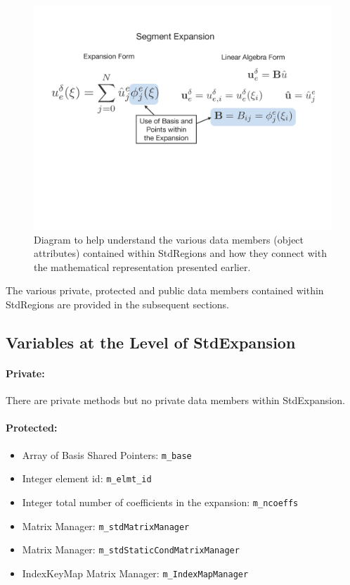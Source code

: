 \begin{figure}[htb]
\centering
\includegraphics[width=6in]{img/StdExpansion.png}
\caption{Diagram to help understand the various data members (object attributes) contained within StdRegions and how they connect with the mathematical representation presented earlier.}
\label{stdregions:stdexpansion}
\end{figure}

The various private, protected and public data members contained within StdRegions are provided in the subsequent sections.

\subsection{Variables at the Level of StdExpansion}

\paragraph{Private:}

There are private methods but no private data members within StdExpansion.

\paragraph{Protected:}

\begin{itemize}
\item  Array of Basis Shared Pointers:  \verb+m_base+
% 
\item  Integer element id: \verb+m_elmt_id+
%
\item Integer total number of coefficients in the expansion:  \verb+m_ncoeffs+
%
\item Matrix Manager: \verb+m_stdMatrixManager+
%
\item Matrix Manager: \verb+m_stdStaticCondMatrixManager+
%
\item IndexKeyMap Matrix Manager: \verb+m_IndexMapManager+
\end{itemize}


